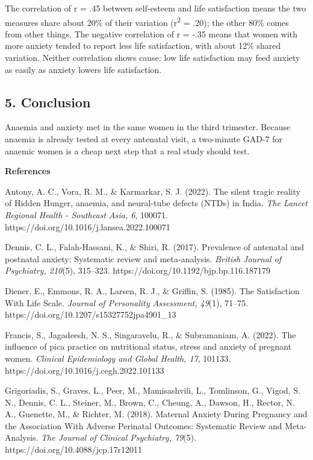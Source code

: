 \documentclass[12pt]{article}
\begin{document}
The correlation of r = .45 between self-esteem and life satisfaction means the two measures share about 20\% of their variation (r\textsuperscript{2} = .20); the other 80\% comes from other things. The negative correlation of r = -.35 means that women with more anxiety tended to report less life satisfaction, with about 12\% shared variation. Neither correlation shows cause: low life satisfaction may feed anxiety as easily as anxiety lowers life satisfaction.

\subsection{5. Conclusion}

Anaemia and anxiety met in the same women in the third trimester. Because anaemia is already tested at every antenatal visit, a two-minute GAD-7 for anaemic women is a cheap next step that a real study should test.

\textbf{References}

Antony, A. C., Vora, R. M., \& Karmarkar, S. J. (2022). The silent tragic reality of Hidden Hunger, anaemia, and neural-tube defects (NTDs) in India. \textit{The Lancet Regional Health - Southeast Asia, 6}, 100071. https://doi.org/10.1016/j.lansea.2022.100071

Dennis, C. L., Falah-Hassani, K., \& Shiri, R. (2017). Prevalence of antenatal and postnatal anxiety: Systematic review and meta-analysis. \textit{British Journal of Psychiatry, 210}(5), 315–323. https://doi.org/10.1192/bjp.bp.116.187179

Diener, E., Emmons, R. A., Larsen, R. J., \& Griffin, S. (1985). The Satisfaction With Life Scale. \textit{Journal of Personality Assessment, 49}(1), 71–75. https://doi.org/10.1207/s15327752jpa4901\_13

Francis, S., Jagadeesh, N. S., Singaravelu, R., \& Subramaniam, A. (2022). The influence of pica practice on nutritional status, stress and anxiety of pregnant women. \textit{Clinical Epidemiology and Global Health, 17}, 101133. https://doi.org/10.1016/j.cegh.2022.101133

Grigoriadis, S., Graves, L., Peer, M., Mamisashvili, L., Tomlinson, G., Vigod, S. N., Dennis, C. L., Steiner, M., Brown, C., Cheung, A., Dawson, H., Rector, N. A., Guenette, M., \& Richter, M. (2018). Maternal Anxiety During Pregnancy and the Association With Adverse Perinatal Outcomes: Systematic Review and Meta-Analysis. \textit{The Journal of Clinical Psychiatry, 79}(5). https://doi.org/10.4088/jcp.17r12011
\end{document}
